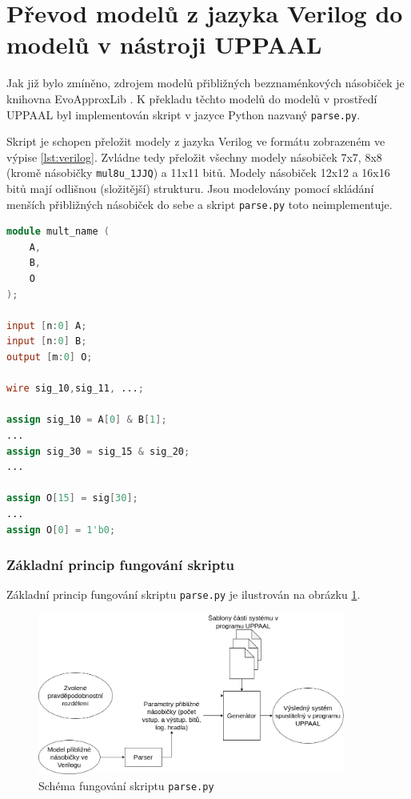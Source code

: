 \section{Převod modelů z jazyka Verilog do modelů v nástroji UPPAAL} \label{parser}
Jak již bylo zmíněno, zdrojem modelů přibližných bezznaménkových násobiček je knihovna EvoApproxLib \cite{circuit_library}. K překladu těchto modelů do modelů v prostředí UPPAAL byl implementován skript v jazyce Python nazvaný \texttt{parse.py}.

Skript je schopen přeložit modely z jazyka Verilog ve formátu zobrazeném ve výpise \ref{lst:verilog}. Zvládne tedy přeložit všechny modely násobiček 7x7, 8x8 (kromě násobičky \texttt{mul8u\_1JJQ}) a 11x11 bitů. Modely násobiček 12x12 a 16x16 bitů mají odlišnou (složitější) strukturu. Jsou modelovány pomocí skládání menších přibližných násobiček do sebe a skript \texttt{parse.py} toto neimplementuje.

\begin{lstlisting}[language={Verilog}, caption={Příklad platného formátu modelu násobičky v jazyce Verilog}, label={lst:verilog}]
module mult_name (
    A,
    B,
    O
);

input [n:0] A;
input [n:0] B;
output [m:0] O;

wire sig_10,sig_11, ...;

assign sig_10 = A[0] & B[1];
...
assign sig_30 = sig_15 & sig_20;
...

assign O[15] = sig[30];
...
assign O[0] = 1'b0;
\end{lstlisting}

\subsubsection{Základní princip fungování skriptu}
Základní princip fungování skriptu \texttt{parse.py} je ilustrován na obrázku \ref{fig:parser_diagram}.
\begin{figure}[H]
    \centering
    \includegraphics[width=0.9\textwidth]{obrazky-figures/parser_diagram.png}
    \caption{Schéma fungování skriptu \texttt{parse.py}}
    \label{fig:parser_diagram}
\end{figure}

